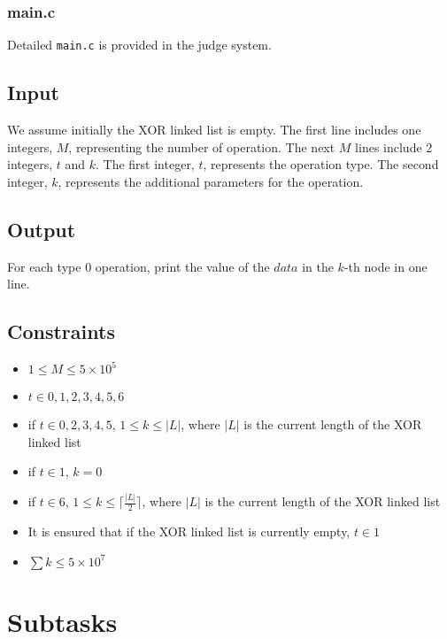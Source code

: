 \subsubsection{main.c}\label{main.c}

Detailed \texttt{main.c} is provided in the judge system.

\subsection{Input}\label{input}

We assume initially the XOR linked list is empty. The first line includes one integers, $M$, representing the number of operation. The next $M$ lines include $2$ integers, $t$ and $k$. The first integer, $t$, represents the operation type. The second integer, $k$, represents the additional parameters for the operation.

\subsection{Output}\label{output}

For each type $0$ operation, print the value of the $data$ in the $k$-th node in one line.

\subsection{Constraints}\label{constraint}

\begin{itemize}
    \item $1\leq M\leq 5\times 10^5$
    \item $t\in 0, 1, 2, 3, 4, 5, 6$
    \item if $t\in 0, 2, 3, 4, 5$, $1\leq k\leq |L|$, where $|L|$ is the current length of the XOR linked list
    \item if $t\in 1$, $k=0$
    \item if $t\in 6$, $1\leq k\leq \lceil{\frac{|L|}{2}}\rceil$, where $|L|$ is the current length of the XOR linked list
    \item It is ensured that if the XOR linked list is currently empty, $t\in 1$
    \item $\sum k\leq 5\times 10^7$
\end{itemize}

\section*{Subtasks}
